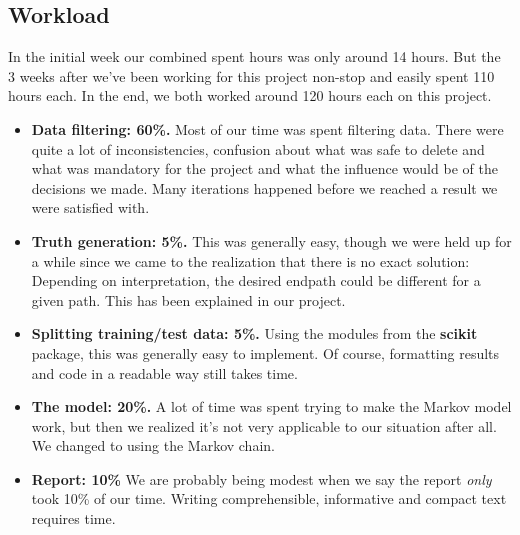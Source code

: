 \begin{appendices}

\section{Workload}

In the initial week our combined spent hours was only around 14 hours. But the 3 weeks after we've been working for this project non-stop and easily spent 110 hours each. In the end, we both worked around 120 hours each on this project.
\begin{itemize}
	\item \textbf{Data filtering: 60\%.} Most of our time was spent filtering data. There were quite a lot of inconsistencies, confusion about what was safe to delete and what was mandatory for the project and what the influence would be of the decisions we made. Many iterations happened before we reached a result we were satisfied with.
	\item \textbf{Truth generation: 5\%.} This was generally easy, though we were held up for a while since we came to the realization that there is no exact solution: Depending on interpretation, the desired endpath could be different for a given path. This has been explained in our project.
	\item \textbf{Splitting training/test data: 5\%.} Using the modules from the \textbf{scikit} package, this was generally easy to implement. Of course, formatting results and code in a readable way still takes time.
	\item \textbf{The model: 20\%.} A lot of time was spent trying to make the Markov model work, but then we realized it's not very applicable to our situation after all.  We changed to using the Markov chain.
	\item \textbf{Report: 10\%} We are probably being modest when we say the report \textit{only} took 10\% of our time. Writing comprehensible, informative and compact text requires time.
\end{itemize} 

\end{appendices}